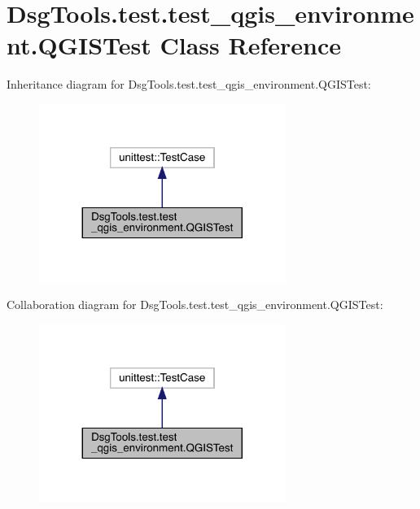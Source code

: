 \hypertarget{class_dsg_tools_1_1test_1_1test__qgis__environment_1_1_q_g_i_s_test}{}\section{Dsg\+Tools.\+test.\+test\+\_\+qgis\+\_\+environment.\+Q\+G\+I\+S\+Test Class Reference}
\label{class_dsg_tools_1_1test_1_1test__qgis__environment_1_1_q_g_i_s_test}


Inheritance diagram for Dsg\+Tools.\+test.\+test\+\_\+qgis\+\_\+environment.\+Q\+G\+I\+S\+Test\+:
\nopagebreak
\begin{figure}[H]
\begin{center}
\leavevmode
\includegraphics[width=227pt]{class_dsg_tools_1_1test_1_1test__qgis__environment_1_1_q_g_i_s_test__inherit__graph}
\end{center}
\end{figure}


Collaboration diagram for Dsg\+Tools.\+test.\+test\+\_\+qgis\+\_\+environment.\+Q\+G\+I\+S\+Test\+:
\nopagebreak
\begin{figure}[H]
\begin{center}
\leavevmode
\includegraphics[width=227pt]{class_dsg_tools_1_1test_1_1test__qgis__environment_1_1_q_g_i_s_test__coll__graph}
\end{center}
\end{figure}
